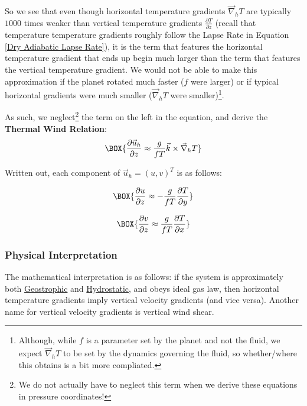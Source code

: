 So we see that even though horizontal temperature gradients \(\vec{\nabla}_h T\) are typically \(1000\) times weaker than vertical temperature gradients \(\frac{\partial T}{\partial z}\) (recall that temperature temperature gradients roughly follow the Lapse Rate in Equation \ref{Dry Adiabatic Lapse Rate}), it is the term that features the horizontal temperature gradient that ends up begin much larger than the term that features the vertical temperature gradient. We would not be able to make this approximation if the planet rotated much faster (\(f\) were larger) or if typical horizontal gradients were much smaller (\(\vec{\nabla}_h T\) were smaller)\footnote{Although, while \(f\) is a parameter set by the planet and not the fluid, we expect \(\vec{\nabla}_h T\) to be set by the dynamics governing the fluid, so whether/where this obtains is a bit more compliated.}.

As such, we neglect\footnote{
    We do not actually have to neglect this term when we derive these equations in pressure coordinates!
} the term on the left in the equation, and derive the \textbf{Thermal Wind Relation}:
\begin{align}\label{Thermal Wind}
    \BOX{\frac{\partial\vec{u}_h}{\partial z}\approx\frac{g}{fT}\vec{k}\times\vec{\nabla}_hT}
\end{align}

Written out, each component of \(\vec{u}_h=(u,v)^T\) is as follows:

\begin{minipage}{0.45\linewidth}
    \begin{align}
        \label{u Thermal}
        \BOX{\frac{\partial u}{\partial z} \approx-\frac{g}{f T}\frac{\partial T}{\partial y}}
    \end{align}
\end{minipage}
\hfill
\begin{minipage}{0.45\linewidth}
    \begin{align}
        \label{v Thermal}
        \BOX{\frac{\partial v}{\partial z} \approx \frac{g}{f T}\frac{\partial T}{\partial x}}
    \end{align}
\end{minipage}

\subsubsection{Physical Interpretation}

\vspace{2mm}The mathematical interpretation is as follows: if the system is approximately both \hyperref[Geostrophic Box]{Geostrophic} and \hyperref[Hydrostatic GFD Box]{Hydrostatic}, and obeys ideal gas law, then horizontal temperature gradients imply vertical velocity gradients (and vice versa). Another name for vertical velocity gradients is vertical wind shear.

